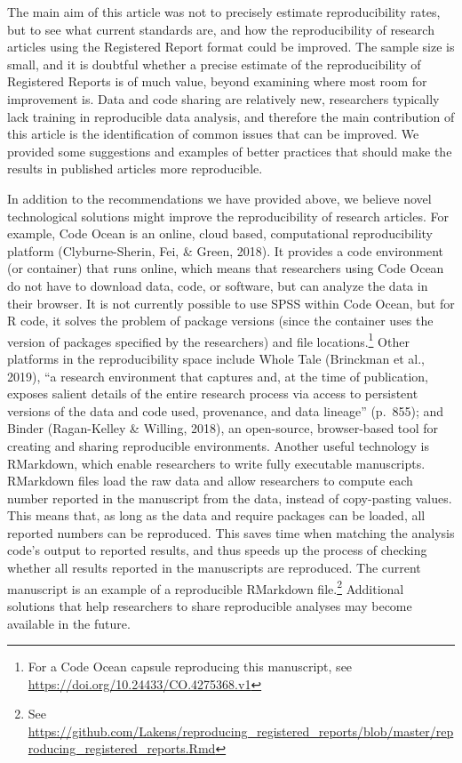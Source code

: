 \documentclass[
  ,jou, a4paper,floatsintext]{apa6}
\begin{document}
The main aim of this article was not to precisely estimate reproducibility rates, but to see what current standards are, and how the reproducibility of research articles using the Registered Report format could be improved. The sample size is small, and it is doubtful whether a precise estimate of the reproducibility of Registered Reports is of much value, beyond examining where most room for improvement is. Data and code sharing are relatively new, researchers typically lack training in reproducible data analysis, and therefore the main contribution of this article is the identification of common issues that can be improved. We provided some suggestions and examples of better practices that should make the results in published articles more reproducible.

In addition to the recommendations we have provided above, we believe novel technological solutions might improve the reproducibility of research articles. For example, Code Ocean is an online, cloud based, computational reproducibility platform (Clyburne-Sherin, Fei, \& Green, 2018). It provides a code environment (or container) that runs online, which means that researchers using Code Ocean do not have to download data, code, or software, but can analyze the data in their browser. It is not currently possible to use SPSS within Code Ocean, but for R code, it solves the problem of package versions (since the container uses the version of packages specified by the researchers) and file locations.\footnote{For a Code Ocean capsule reproducing this manuscript, see \url{https://doi.org/10.24433/CO.4275368.v1}} Other platforms in the reproducibility space include Whole Tale (Brinckman et al., 2019), \enquote{a research environment that captures and, at the time of publication, exposes salient details of the entire research process via access to persistent versions of the data and code used, provenance, and data lineage} (p.~855); and Binder (Ragan-Kelley \& Willing, 2018), an open-source, browser-based tool for creating and sharing reproducible environments.
Another useful technology is RMarkdown, which enable researchers to write fully executable manuscripts. RMarkdown files load the raw data and allow researchers to compute each number reported in the manuscript from the data, instead of copy-pasting values. This means that, as long as the data and require packages can be loaded, all reported numbers can be reproduced. This saves time when matching the analysis code's output to reported results, and thus speeds up the process of checking whether all results reported in the manuscripts are reproduced. The current manuscript is an example of a reproducible RMarkdown file.\footnote{See \url{https://github.com/Lakens/reproducing_registered_reports/blob/master/reproducing_registered_reports.Rmd}} Additional solutions that help researchers to share reproducible analyses may become available in the future.
\end{document}
